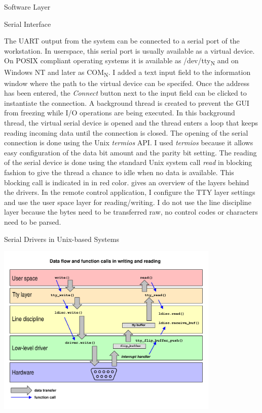 \documentclass{matthijs}
\begin{document}
\begin{hoofdstuk}{Software Layer}
		\begin{paragraaf}{Serial Interface}

			The UART output from the system can be connected to a serial port of the workstation.
			In userspace, this serial port is usually available as a virtual device.
			On POSIX compliant operating systems it is available as \textrm{/dev/tty\textsubscript{N}} and on Windows NT and later as \textrm{COM\textsubscript{N}}.
			I added a text input field to the information window where the path to the virtual device can be specifed.
			Once the address has been entered, the \textit{Connect} button next to the input field can be clicked to instantiate the connection.
			A background thread is created to prevent the GUI from freezing while I/O operations are being executed.
			In this background thread, the virtual serial device is opened and the thread enters a loop that keeps reading incoming data until the connection is closed.
			The opening of the serial connection is done using the Unix \textit{termios} API.
			I used \textit{termios} because it allows easy configuration of the data bit amount and the parity bit setting.
			The reading of the serial device is done using the standard Unix system call \textit{read} in blocking fashion to give the thread a chance to idle when no data is available.
			This blocking call is indicated in  in red color.
			 gives an overview of the layers behind the drivers.
			In the remote control application, I configure the TTY layer settings and use the user space layer for reading/writing.
			I do not use the line discipline layer because the bytes need to be transferred raw, no control codes or characters need to be parsed.

			\bigskip
			\begin{figuur}{Serial Drivers in Unix-based Systems}
				\vspace{-5ex}
				\singlespacing
				\centerline{
					\includegraphics[width=0.8\textwidth, clip, trim=0cm 1cm 0cm 0.1cm]{rubini2006-img1.pdf}
				}\vspace{-1.2ex}\cite{rubini2006serial}\vspace{-0.7ex}
				\onehalfspacing
			\end{figuur}
			

\end{paragraaf}
\end{hoofdstuk}
\end{document}
